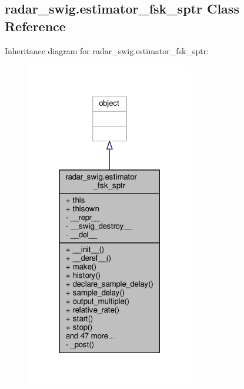 \subsection{radar\+\_\+swig.\+estimator\+\_\+fsk\+\_\+sptr Class Reference}
\label{classradar__swig_1_1estimator__fsk__sptr}


Inheritance diagram for radar\+\_\+swig.\+estimator\+\_\+fsk\+\_\+sptr\+:
\nopagebreak
\begin{figure}[H]
\begin{center}
\leavevmode
\includegraphics[width=208pt]{dc/dfa/classradar__swig_1_1estimator__fsk__sptr__inherit__graph}
\end{center}
\end{figure}


